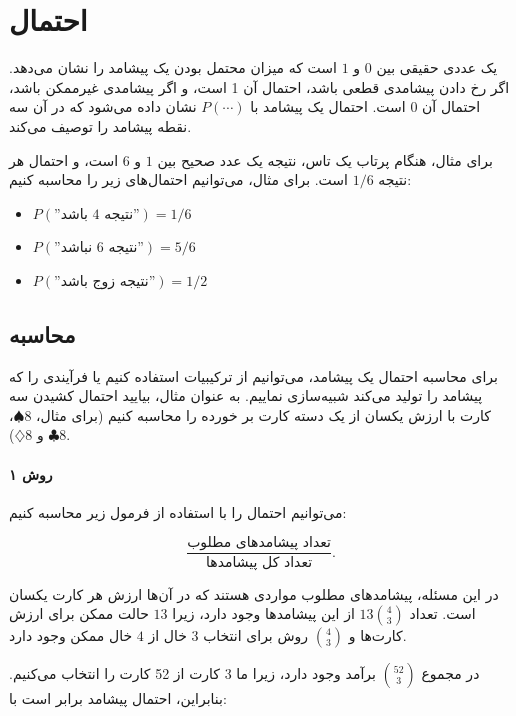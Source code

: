 \chapter{احتمال}


یک  عددی حقیقی بین $0$ و $1$ است
که میزان محتمل بودن یک پیشامد را نشان می‌دهد.
اگر رخ دادن پیشامدی قطعی باشد،
احتمال آن 1 است،
و اگر پیشامدی غیرممکن باشد،
احتمال آن 0 است.
احتمال یک پیشامد با $P(\cdots)$ نشان داده می‌شود
که در آن سه نقطه پیشامد را توصیف می‌کند.

برای مثال، هنگام پرتاب یک تاس،
نتیجه یک عدد صحیح بین $1$ و $6$ است،
و احتمال هر نتیجه $1/6$ است.
برای مثال، می‌توانیم احتمال‌های زیر را محاسبه کنیم:

\begin{itemize}[noitemsep]
\item $P(\textrm{''نتیجه 4 باشد''})=1/6$
\item $P(\textrm{''نتیجه 6 نباشد''})=5/6$
\item $P(\textrm{''نتیجه زوج باشد''})=1/2$
\end{itemize}

\section{محاسبه}

برای محاسبه احتمال یک پیشامد،
می‌توانیم از ترکیبیات استفاده کنیم
یا فرآیندی را که پیشامد را تولید می‌کند شبیه‌سازی نماییم.
به عنوان مثال، بیایید احتمال کشیدن سه کارت با ارزش یکسان
از یک دسته کارت بر خورده را محاسبه کنیم
(برای مثال، $\spadesuit 8$، $\clubsuit 8$ و $\diamondsuit 8$).

\subsubsection*{روش ۱}

می‌توانیم احتمال را با استفاده از فرمول زیر محاسبه کنیم:

\[\frac{\textrm{تعداد پیشامدهای مطلوب}}{\textrm{تعداد کل پیشامدها}}.\]

در این مسئله، پیشامدهای مطلوب مواردی هستند
که در آن‌ها ارزش هر کارت یکسان است.
تعداد $13 {4 \choose 3}$ از این پیشامدها وجود دارد،
زیرا $13$ حالت ممکن برای ارزش کارت‌ها
و ${4 \choose 3}$ روش برای انتخاب $3$ خال از $4$ خال ممکن وجود دارد.

در مجموع ${52 \choose 3}$ برآمد وجود دارد،
زیرا ما 3 کارت از 52 کارت را انتخاب می‌کنیم.
بنابراین، احتمال پیشامد برابر است با:

